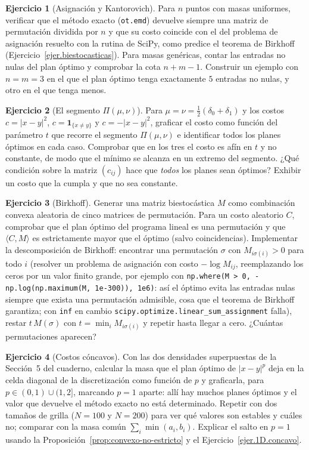 \documentclass[12pt, a4paper]{amsbook}
\theoremstyle{remark}
\theoremstyle{definition}
\newtheorem{ejercicio}{Ejercicio}[chapter]
\numberwithin{section}{chapter}
\numberwithin{subsection}{section}
\numberwithin{equation}{section}
\numberwithin{figure}{chapter}
\begin{document}
\begin{ejercicio}[Asignación y Kantorovich]\label{ejc.MK.asignacion}
Para $n$ puntos con masas uniformes, verificar que el método exacto
(\texttt{ot.emd}) devuelve siempre una matriz de permutación dividida por $n$
y que su costo coincide con el del problema de asignación resuelto con la
rutina de SciPy, como predice el teorema de Birkhoff
(Ejercicio~\ref{ejer.biestocasticas}). Para masas genéricas, contar las
entradas no nulas del plan óptimo y comprobar la cota $n+m-1$. Construir un
ejemplo con $n=m=3$ en el que el plan óptimo tenga exactamente $5$ entradas no
nulas, y otro en el que tenga menos.
\end{ejercicio}

\begin{ejercicio}[El segmento $\Pi(\mu,\nu)$]\label{ejc.MK.segmento}
Para $\mu=\nu=\frac12(\delta_0+\delta_1)$ y los costos $c=|x-y|^2$,
$c=\mathbf 1_{\{x\ne y\}}$ y $c=-|x-y|^2$, graficar el costo como función del
parámetro $t$ que recorre el segmento $\Pi(\mu,\nu)$ e identificar todos los
planes óptimos en cada caso. Comprobar que en los tres el costo es afín en
$t$ y no constante, de modo que el mínimo se alcanza en un extremo del
segmento. ¿Qué condición sobre la matriz $(c_{ij})$ hace que \emph{todos} los
planes sean óptimos? Exhibir un costo que la cumpla y que no sea constante.
\end{ejercicio}

\begin{ejercicio}[Birkhoff]\label{ejc.MK.birkhoff}
Generar una matriz biestocástica $M$ como combinación convexa aleatoria de
cinco matrices de permutación. Para un costo aleatorio $C$, comprobar que el
plan óptimo del programa lineal es una permutación y que $\langle C,M\rangle$
es estrictamente mayor que el óptimo (salvo coincidencias). Implementar la
descomposición de Birkhoff: encontrar una permutación $\sigma$ con
$M_{i\sigma(i)}>0$ para todo $i$ (resolver un problema de asignación con costo
$-\log M_{ij}$, reemplazando los ceros por un valor finito grande, por
ejemplo con
\texttt{np.where(M > 0, -np.log(np.maximum(M, 1e-300)), 1e6)}: así el óptimo
evita las entradas nulas siempre que exista una permutación admisible, cosa
que el teorema de Birkhoff garantiza; con \texttt{inf} en cambio
\texttt{scipy.optimize.linear\_sum\_assignment} falla), restar $t\,M(\sigma)$ con $t=\min_iM_{i\sigma(i)}$ y repetir hasta
llegar a cero. ¿Cuántas permutaciones aparecen?
\end{ejercicio}

\begin{ejercicio}[Costos cóncavos]\label{ejc.MK.concavos}
Con las dos densidades superpuestas de la Sección~5 del cuaderno, calcular la
masa que el plan óptimo de $|x-y|^p$ deja en la celda diagonal de la
discretización como función de $p$ y graficarla, para $p\in(0,1)\cup(1,2]$,
marcando $p=1$ aparte: allí hay muchos planes óptimos y el valor que devuelve
el método exacto no está determinado. Repetir con dos tamaños de grilla
($N=100$ y $N=200$) para ver qué valores son estables y cuáles no; comparar
con la masa común $\sum_i\min(a_i,b_i)$. Explicar el salto en $p=1$ usando la
Proposición~\ref{prop:convexo-no-estricto} y el
Ejercicio~\ref{ejer.1D.concavo}.
\end{ejercicio}
\end{document}
